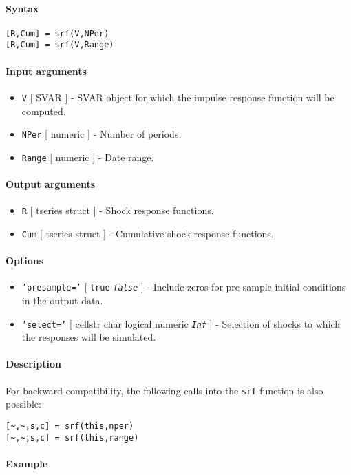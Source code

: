


	\paragraph{Syntax}\label{syntax}

\begin{verbatim}
[R,Cum] = srf(V,NPer)
[R,Cum] = srf(V,Range)
\end{verbatim}

\paragraph{Input arguments}\label{input-arguments}

\begin{itemize}
\item
  \texttt{V} {[} SVAR {]} - SVAR object for which the impulse response
  function will be computed.
\item
  \texttt{NPer} {[} numeric {]} - Number of periods.
\item
  \texttt{Range} {[} numeric {]} - Date range.
\end{itemize}

\paragraph{Output arguments}\label{output-arguments}

\begin{itemize}
\item
  \texttt{R} {[} tseries \textbar{} struct {]} - Shock response
  functions.
\item
  \texttt{Cum} {[} tseries \textbar{} struct {]} - Cumulative shock
  response functions.
\end{itemize}

\paragraph{Options}\label{options}

\begin{itemize}
\item
  \texttt{'presample='} {[} \texttt{true} \textbar{}
  \emph{\texttt{false}} {]} - Include zeros for pre-sample initial
  conditions in the output data.
\item
  \texttt{'select='} {[} cellstr \textbar{} char \textbar{} logical
  \textbar{} numeric \textbar{} \emph{\texttt{Inf}} {]} - Selection of
  shocks to which the responses will be simulated.
\end{itemize}

\paragraph{Description}\label{description}

For backward compatibility, the following calls into the \texttt{srf}
function is also possible:

\begin{verbatim}
[~,~,s,c] = srf(this,nper)
[~,~,s,c] = srf(this,range)
\end{verbatim}

\paragraph{Example}\label{example}


